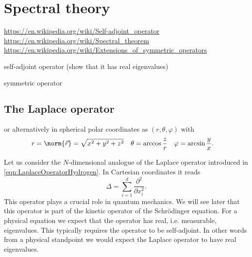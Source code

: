 \section{Spectral theory}

\url{https://en.wikipedia.org/wiki/Self-adjoint_operator}
\url{https://en.wikipedia.org/wiki/Spectral_theorem}
\url{https://en.wikipedia.org/wiki/Extensions_of_symmetric_operators}





self-adjoint operator
(show that it has real eigenvalues)

symmetric operator



\subsection{The Laplace operator}

or alternatively in spherical polar coordinates
as $(r, \theta, \varphi)$ with
\begin{align*}
	r &= \norm{\vec{r}} = \sqrt{x^2+y^2+z^2} & \theta &= \arccos\frac{z}{r} & \varphi &= \arcsin\frac{y}{x}.
\end{align*}




\label{sec:SpectrumLaplace}
Let us consider the $N$-dimensional analogue of the Laplace operator
introduced in \eqref{eqn:LaplaceOperatorHydrogen}.
In Cartesian coordinates it reads
\[ \Delta = \sum_{i=1}^d \frac{\partial^2}{\partial x_i^2}. \]
This operator plays a crucial role in quantum mechanics.
We will see later that this operator is part of the
kinetic operator of the Schrödinger equation.
For a physical equation we expect that the operator has
real, i.e. measurable, eigenvalues.
This typically requires the operator to be self-adjoint.
In other words from a physical standpoint we would expect
the Laplace operator to have real eigenvalues.

